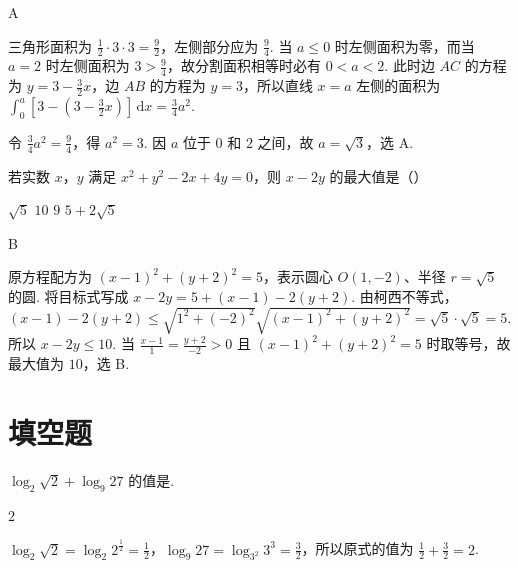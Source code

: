 \begin{answer}
A
\end{answer}

\begin{solution}
三角形面积为 \(\frac{1}{2}\cdot3\cdot3=\frac{9}{2}\)，左侧部分应为 \(\frac{9}{4}\). 当 \(a\leqslant0\) 时左侧面积为零，而当 \(a=2\) 时左侧面积为 \(3>\frac{9}{4}\)，故分割面积相等时必有 \(0<a<2\). 此时边 \(AC\) 的方程为 \(y=3-\frac{3}{2}x\)，边 \(AB\) 的方程为 \(y=3\)，所以直线 \(x=a\) 左侧的面积为
\(\int_{0}^{a}\left[3-\left(3-\frac{3}{2}x\right)\right]\,\mathrm{d}x=\frac{3}{4}a^{2}\).

令 \(\frac{3}{4}a^{2}=\frac{9}{4}\)，得 \(a^{2}=3\). 因 \(a\) 位于 \(0\) 和 \(2\) 之间，故 \(a=\sqrt{3}\)，选 A.
\end{solution}

\begin{problem}

若实数 \(x\)，\(y\) 满足 \(x^{2} + y^{2} - 2x + 4y = 0\)，则 \(x - 2y\) 的最大值是（\quad）

\choices
{\(\sqrt{5} \)}
{\(10\)}
{\(9\)}
{\(5 + 2\sqrt{5} \)}
\end{problem}

\begin{answer}
B
\end{answer}

\begin{solution}
原方程配方为 \((x-1)^{2}+(y+2)^{2}=5\)，表示圆心 \(O(1,-2)\)、半径 \(r=\sqrt{5}\) 的圆. 将目标式写成
\(x-2y=5+(x-1)-2(y+2)\). 由柯西不等式，
\((x-1)-2(y+2)\leqslant\sqrt{1^{2}+(-2)^{2}}\sqrt{(x-1)^{2}+(y+2)^{2}}=\sqrt{5}\cdot\sqrt{5}=5\). 所以 \(x-2y\leqslant10\). 当 \(\frac{x-1}{1}=\frac{y+2}{-2}>0\) 且 \((x-1)^{2}+(y+2)^{2}=5\) 时取等号，故最大值为 \(10\)，选 B.
\end{solution}

\section{填空题}

\begin{problem}

\(\log_{2}\sqrt{2} + \log_{9}27 \) 的值是\fillinblank{}.
\end{problem}

\begin{answer}
\(2\)
\end{answer}

\begin{solution}
\(\log_{2}\sqrt{2}=\log_{2}2^{\frac{1}{2}}=\frac{1}{2}\)，\(\log_{9}27=\log_{3^{2}}3^{3}=\frac{3}{2}\)，所以原式的值为 \(\frac{1}{2}+\frac{3}{2}=2\).
\end{solution}

